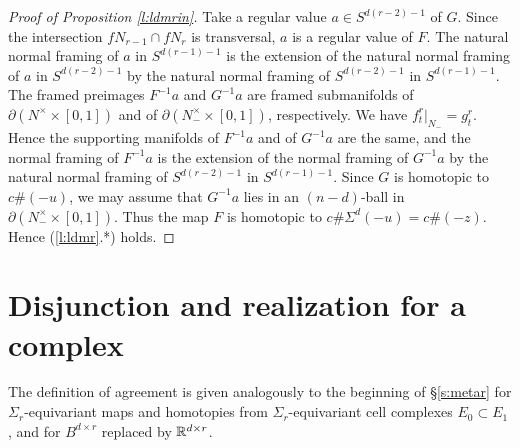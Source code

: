 \documentclass[12pt]{article}
\theoremstyle{plain}
\theoremstyle{definition}
\begin{document}
\begin{proof}[Proof of Proposition \ref{l:ldmrin}]
Take a regular value $a\in S^{d(r-2)-1}$ of $G$.
Since the intersection $fN_{r-1}\cap fN_r$ is transversal, $a$ is a regular value of $F$.
The natural normal framing of $a$ in $S^{d(r-1)-1}$ is the extension of the natural normal framing of $a$
in $S^{d(r-2)-1}$ by the natural normal framing of $S^{d(r-2)-1}$ in $S^{d(r-1)-1}$.
The framed preimages $F^{-1}a$ and $G^{-1}a$ are framed submanifolds of $\partial(N^\times\times[0,1])$ and of $\partial(N^\times_-\times[0,1])$, respectively.
We have $f_t^r|_{N_-}=g_t^r$.
Hence the supporting manifolds of $F^{-1}a$ and of $G^{-1}a$ are the same, and the normal framing
of $F^{-1}a$ is the extension of the normal framing of $G^{-1}a$ by the natural normal framing
of $S^{d(r-2)-1}$ in $S^{d(r-1)-1}$.
Since $G$ is homotopic to $c\#(-u)$, we may assume that $G^{-1}a$ lies in an $(n-d)$-ball in $\partial(N^\times_-\times[0,1])$.
Thus the map $F$ is homotopic to $c\#\Sigma^d(-u)=c\#(-z)$.
Hence (\ref{l:ldmr}.*) holds.
\end{proof}



\section{Disjunction and realization for a complex}\label{s:prmmw}

The definition of agreement is given analogously to the beginning of \S\ref{s:metar}
for $\Sigma_r$-equivariant maps and homotopies from $\Sigma_r$-equivariant cell complexes $E_0\subset E_1$,
and for $B^{d\times r}$ replaced by ${\mathbb R}^{d\times r}$.

\end{document}
